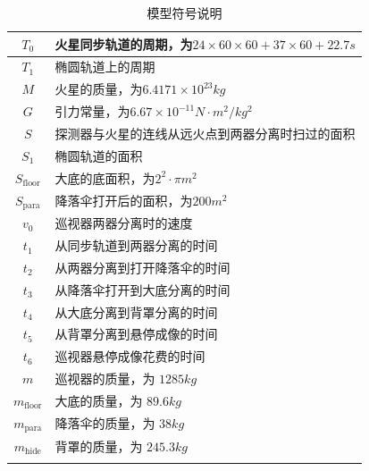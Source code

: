 \documentclass[hyperref,a4paper,UTF8]{ctexart}
\begin{document}
\begin{longtable}[h]{|c|p{10cm}|}
    \hline
    $T_0$              & 火星同步轨道的周期，为$24\times 60\times 60 + 37\times
    60 + 22.7s$                                                                 \\
    \hline
    $T_1$              & 椭圆轨道上的周期                                       \\
    \hline
    $M$                & 火星的质量，为$6.4171\times 10^{23}kg$                 \\
    \hline
    $G$                & 引力常量，为$6.67\times 10^{-11}N·m^2/kg^2$            \\
    \hline
    $S$                & 探测器与火星的连线从远火点到两器分离时扫过的面积       \\
    \hline
    $S_1$              & 椭圆轨道的面积                                         \\
    \hline
    $S_{\text{floor}}$ & 大底的底面积，为$2^2·\pi m^2$                          \\
    \hline
    $S_{\text{para}}$  & 降落伞打开后的面积，为$200m^2$                         \\
    \hline
    $v_0$              & 巡视器两器分离时的速度                                 \\
    \hline
    $t_1$              & 从同步轨道到两器分离的时间                             \\
    \hline
    $t_2$              & 从两器分离到打开降落伞的时间                           \\
    \hline
    $t_3$              & 从降落伞打开到大底分离的时间                           \\
    \hline
    $t_4$              & 从大底分离到背罩分离的时间                             \\
    \hline
    $t_5$              & 从背罩分离到悬停成像的时间                             \\
    \hline
    $t_6$              & 巡视器悬停成像花费的时间                               \\
    \hline
    $m$                & 巡视器的质量，为 $1285kg$                              \\
    \hline
    $m_{\text{floor}}$ & 大底的质量，为 $89.6kg$                                \\
    \hline
    $m_{\text{para}}$  & 降落伞的质量，为 $38kg$                                \\
    \hline
    $m_{\text{hide}}$  & 背罩的质量，为 $245.3kg$                               \\
    \hline
    \caption{模型符号说明}
\end{longtable}
\end{document}
